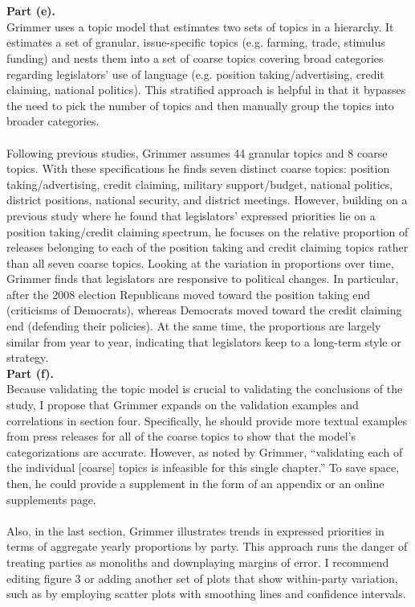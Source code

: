 \documentclass[letterpaper,12pt]{article}
\theoremstyle{definition}
\begin{document}
\\\\
\noindent\textbf {Part (e).} 
\vspace{5mm}
\\
\indent
Grimmer uses a topic model that estimates two sets of topics in a hierarchy. It estimates a set of granular, issue-specific topics (e.g. farming, trade, stimulus funding) and nests them into a set of coarse topics covering broad categories regarding legislators’ use of language (e.g. position taking/advertising, credit claiming, national politics). This stratified approach is helpful in that it bypasses the need to pick the number of topics and then manually group the topics into broader categories. \\
\\
\indent
Following previous studies, Grimmer assumes 44 granular topics and 8 coarse topics. With these specifications he finds seven distinct coarse topics: position taking/advertising, credit claiming, military support/budget, national politics, district positions, national security, and district meetings. However, building on a previous study where he found that legislators’ expressed priorities lie on a position taking/credit claiming spectrum, he focuses on the relative proportion of releases belonging to each of the position taking and credit claiming topics rather than all seven coarse topics. Looking at the variation in proportions over time, Grimmer finds that legislators are responsive to political changes. In particular, after the 2008 election Republicans moved toward the position taking end (criticisms of Democrats), whereas Democrats moved toward the credit claiming end (defending their policies). At the same time, the proportions are largely similar from year to year, indicating that legislators keep to a long-term style or strategy.
\vspace{5mm}
\\
\noindent\textbf {Part (f).} 
\vspace{5mm}
\\
\indent
Because validating the topic model is crucial to validating the conclusions of the study, I propose that Grimmer expands on the validation examples and correlations in section four. Specifically, he should provide more textual examples from press releases for all of the coarse topics to show that the model’s categorizations are accurate. However, as noted by Grimmer, ``validating each of the individual [coarse] topics is infeasible for this single chapter.'' To save space, then, he could provide a supplement in the form of an appendix or an online supplements page.
\\
\\
\indent
Also, in the last section, Grimmer illustrates trends in expressed priorities in terms of aggregate yearly proportions by party. This approach runs the danger of treating parties as monoliths and downplaying margins of error. I recommend editing figure 3 or adding another set of plots that show within-party variation, such as by employing scatter plots with smoothing lines and confidence intervals.
\end{document}
